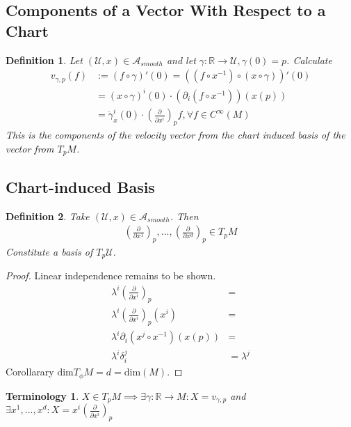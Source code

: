 \documentclass[10pt, oneside]{article}
\newcommand{\R}{\mathbb{R}}
\newtheorem{defn}{Definition}
\newtheorem{Terminology}{Terminology}
\begin{document}
  \subsection{Components of a Vector With Respect to a Chart}
  \begin{defn}
     Let $(\mathcal{U},x) \in \mathcal{A}_{smooth}$ and let $\gamma: \R \to \mathcal{U}, \gamma(0) =p$. Calculate
     \begin{align*}
        v_{\gamma,p}(f)&:= (f \circ \gamma)'(0) = ((f \circ x^{-1})\circ(x\circ \gamma))'(0) \\
        &= (x \circ \gamma)^i (0) \cdot(\partial_i(f \circ x^{-1}))(x(p)) \\
        &= \dot{\gamma}_x^i (0) \cdot(\frac{\partial}{\partial x^i})_p f, \forall f \in C^{\infty}(M)
     \end{align*}
     This is the components of the velocity vector from the chart induced basis of the vector from $T_p M$.
  \end{defn}
  \subsection{Chart-induced Basis}
  \begin{defn}
     Take $(\mathcal{U},x) \in \mathcal{A}_{smooth}$. Then
     \begin{align*}
        (\frac{\partial}{\partial x^1})_p, ..., (\frac{\partial}{\partial x^d})_p \in T_p M
     \end{align*}
     Constitute a basis of $T_p \mathcal{U}$.
  \end{defn}
  \begin{proof}
     Linear independence remains to be shown.
     \begin{align*}
        \lambda^i (\frac{\partial}{\partial x^i})_p &=  \\
        \lambda^i (\frac{\partial}{\partial x^i})_p(x^i) &=\\
        \lambda^i \partial_i (x^j \circ x^{-1})(x(p)) &=  \\
        \lambda^i \delta_i^j &= \lambda^j
     \end{align*}
     Corollarary $\text{dim}T_\phi M = d = \text{dim}(M)$.
  \end{proof}
  \begin{Terminology}
     $X \in T_p M \implies \exists \gamma: \R \to M: X= v_{\gamma,p}$ and $\exists x^1, ..., x^d: X = x^i(\frac{\partial}{\partial x^i})_p$
  \end{Terminology}
\end{document}
